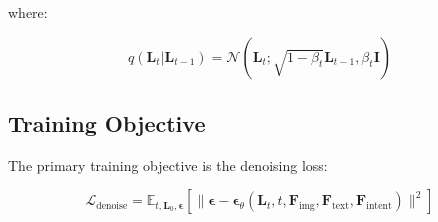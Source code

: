 \documentclass[journal,article,submit,pdftex,moreauthors]{Definitions/mdpi}
\begin{document}
where:
\begin{linenomath}
\begin{equation}
q(\mathbf{L}_t | \mathbf{L}_{t-1}) = \mathcal{N}(\mathbf{L}_t; \sqrt{1-\beta_t}\mathbf{L}_{t-1}, \beta_t \mathbf{I})
\end{equation}
\end{linenomath}

\subsection{Training Objective}

The primary training objective is the denoising loss:
\begin{linenomath}
\begin{equation}
\mathcal{L}_{\text{denoise}} = \mathbb{E}_{t, \mathbf{L}_0, \boldsymbol{\epsilon}} \left[ \|\boldsymbol{\epsilon} - \boldsymbol{\epsilon}_\theta(\mathbf{L}_t, t, \mathbf{F}_{\text{img}}, \mathbf{F}_{\text{text}}, \mathbf{F}_{\text{intent}})\|^2 \right]
\end{equation}
\end{linenomath}

\vspace{6pt} 




\end{document}
